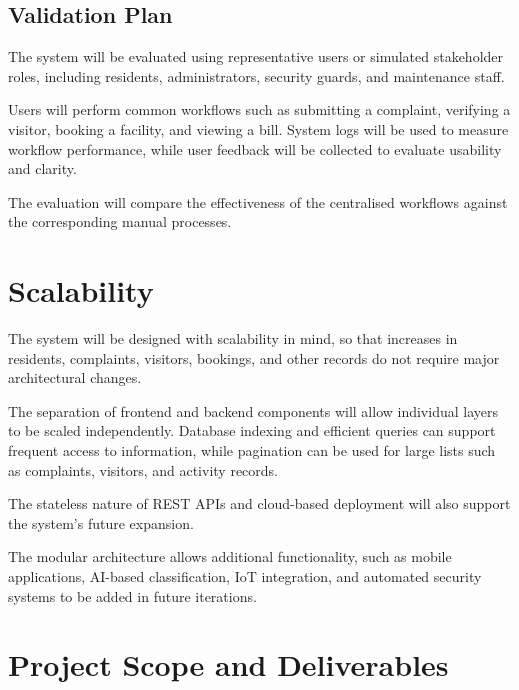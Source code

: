 \documentclass[11pt,a4paper]{article}
\begin{document}
\subsection{Validation Plan}

The system will be evaluated using representative users or simulated stakeholder roles, including residents, administrators, security guards, and maintenance staff.

Users will perform common workflows such as submitting a complaint, verifying a visitor, booking a facility, and viewing a bill. System logs will be used to measure workflow performance, while user feedback will be collected to evaluate usability and clarity.

The evaluation will compare the effectiveness of the centralised workflows against the corresponding manual processes.


\section{Scalability}

The system will be designed with scalability in mind, so that increases in residents, complaints, visitors, bookings, and other records do not require major architectural changes.

The separation of frontend and backend components will allow individual layers to be scaled independently. Database indexing and efficient queries can support frequent access to information, while pagination can be used for large lists such as complaints, visitors, and activity records.

The stateless nature of REST APIs and cloud-based deployment will also support the system's future expansion.

The modular architecture allows additional functionality, such as mobile applications, AI-based classification, IoT integration, and automated security systems to be added in future iterations.


\section{Project Scope and Deliverables}
\end{document}
